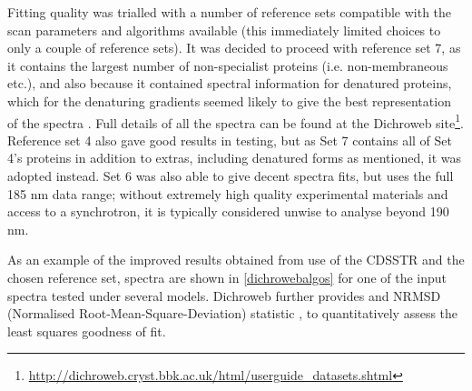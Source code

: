 Fitting quality was trialled with a number of reference sets compatible with the scan parameters and algorithms available (this immediately limited choices to only a couple of reference sets). It was decided to proceed with reference set 7, as it contains the largest number of non-specialist proteins (i.e. non-membraneous etc.), and also because it contained spectral information for denatured proteins, which for the denaturing gradients seemed likely to give the best representation of the spectra \citep{Sreerama2000b,Sreerama2000a}. Full details of all the spectra can be found at the Dichroweb site\footnote{\url{http://dichroweb.cryst.bbk.ac.uk/html/userguide_datasets.shtml}}. Reference set 4 also gave good results in testing, but as Set 7 contains all of Set 4's proteins in addition to extras, including denatured forms as mentioned, it was adopted instead. Set 6 was also able to give decent spectra fits, but uses the full 185 nm data range; without extremely high quality experimental materials and access to a synchrotron, it is typically considered unwise to analyse beyond 190 nm.

As an example of the improved results obtained from use of the CDSSTR and the chosen reference set, spectra are shown in \vref{dichrowebalgos} for one of the input spectra tested under several models. Dichroweb further provides and NRMSD (Normalised Root-Mean-Square-Deviation) statistic \citep{Mao1982}, to quantitatively assess the least squares goodness of fit.

